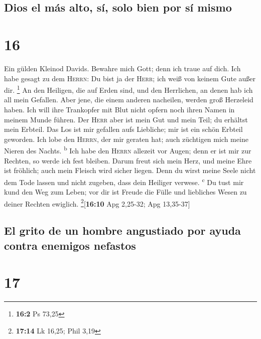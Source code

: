 \hypertarget{dios-el-muxe1s-alto-suxed-solo-bien-por-suxed-mismo}{%
\subsection{Dios el más alto, sí, solo bien por sí
mismo}\label{dios-el-muxe1s-alto-suxed-solo-bien-por-suxed-mismo}}

\hypertarget{section-15}{%
\section{16}\label{section-15}}

 Ein gülden Kleinod Davids. Bewahre mich Gott; denn ich
traue auf dich.  Ich habe gesagt zu dem \textsc{Herrn}: Du
bist ja der \textsc{Herr}; ich weiß von keinem Gute außer dir.
\footnote{\textbf{16:2} Ps 73,25}  An den Heiligen, die
auf Erden sind, und den Herrlichen, an denen hab ich all mein Gefallen.
 Aber jene, die einem anderen nacheilen, werden groß
Herzeleid haben. Ich will ihre Trankopfer mit Blut nicht opfern noch
ihren Namen in meinem Munde führen.  Der \textsc{Herr}
aber ist mein Gut und mein Teil; du erhältst mein Erbteil.
 Das Los ist mir gefallen aufs Liebliche; mir ist ein
schön Erbteil geworden.  Ich lobe den \textsc{Herrn}, der
mir geraten hat; auch züchtigen mich meine Nieren des Nachts.
\textsuperscript{b}  Ich habe den \textsc{Herrn} allezeit
vor Augen; denn er ist mir zur Rechten, so werde ich fest bleiben.
 Darum freut sich mein Herz, und meine Ehre ist fröhlich;
auch mein Fleisch wird sicher liegen.  Denn du wirst
meine Seele nicht dem Tode lassen und nicht zugeben, dass dein Heiliger
verwese. \textsuperscript{c}  Du tust mir kund den Weg
zum Leben; vor dir ist Freude die Fülle und liebliches Wesen zu deiner
Rechten ewiglich. \footnote{\textbf{17:14} Lk 16,25; Phil 3,19}{[}\textbf{16:10}
Apg 2,25-32; Apg 13,35-37{]}

\hypertarget{el-grito-de-un-hombre-angustiado-por-ayuda-contra-enemigos-nefastos}{%
\subsection{El grito de un hombre angustiado por ayuda contra enemigos
nefastos}\label{el-grito-de-un-hombre-angustiado-por-ayuda-contra-enemigos-nefastos}}

\hypertarget{section-16}{%
\section{17}\label{section-16}}

